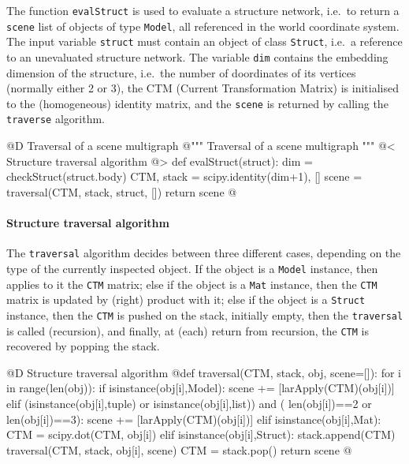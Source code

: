\documentclass[11pt,oneside]{article}    %
\begin{document}
The function \texttt{evalStruct} is used to evaluate a structure network, i.e.~to return a \texttt{scene}
list of objects of type \texttt{Model}, all referenced in the world coordinate system. The input variable \texttt{struct} must contain an object of class \texttt{Struct}, i.e.~a reference to an unevaluated structure network. The variable \texttt{dim}  contains the embedding dimension of the structure, i.e.~the number of doordinates of its vertices (normally either 2 or 3), the CTM (Current Transformation Matrix) is initialised to the (homogeneous) identity matrix, and  the \texttt{scene} is returned by calling the \texttt{traverse} algorithm.

@D Traversal of a scene multigraph
@{""" Traversal of a scene multigraph """
@< Structure traversal algorithm @>
def evalStruct(struct):
    dim = checkStruct(struct.body)
    CTM, stack = scipy.identity(dim+1), []
    scene = traversal(CTM, stack, struct, []) 
    return scene
@}

\paragraph{Structure traversal algorithm}

The \texttt{traversal} algorithm decides between three different cases, depending on the type of the currently inspected object. If the object is a \texttt{Model} instance, then applies to it the \texttt{CTM} matrix; else if the object is a \texttt{Mat} instance, then the \texttt{CTM} matrix is updated by (right) product with it; else if the object is a \texttt{Struct} instance, then the \texttt{CTM} is pushed on the stack, initially empty, then the \texttt{traversal} is called (recursion), and finally, at (each) return from recursion, the \texttt{CTM} is recovered by popping the stack.

@D Structure traversal algorithm 
@{def traversal(CTM, stack, obj, scene=[]):
    for i in range(len(obj)):
        if isinstance(obj[i],Model): 
            scene += [larApply(CTM)(obj[i])]
        elif (isinstance(obj[i],tuple) or isinstance(obj[i],list)) and (
                len(obj[i])==2 or len(obj[i])==3):
            scene += [larApply(CTM)(obj[i])]
        elif isinstance(obj[i],Mat): 
            CTM = scipy.dot(CTM, obj[i])
        elif isinstance(obj[i],Struct):
            stack.append(CTM) 
            traversal(CTM, stack, obj[i], scene)
            CTM = stack.pop()
    return scene
@}
\end{document}
